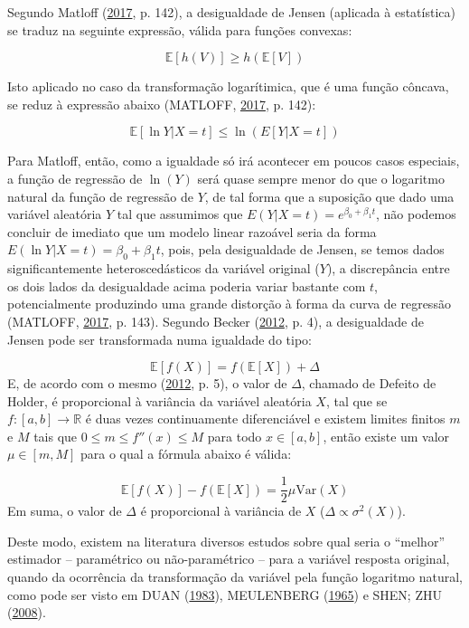 \documentclass[a4paper]{article}
\begin{document}
Segundo Matloff (\protect\hyperlink{ref-matloff2017}{2017}, p. 142), a
desigualdade de Jensen (aplicada à estatística) se traduz na seguinte
expressão, válida para funções convexas:

\[\mathbb{E}[h(V)] \geq h(\mathbb{E}[V])\]

Isto aplicado no caso da transformação logarítimica, que é uma função
côncava, se reduz à expressão abaixo (MATLOFF,
\protect\hyperlink{ref-matloff2017}{2017}, p. 142):

\[\mathbb{E}[\ln Y|X = t] \leq \ln(E[Y|X = t])\]

Para Matloff, então, como a igualdade só irá acontecer em poucos casos
especiais, a função de regressão de \(\ln(Y)\) será quase sempre menor
do que o logaritmo natural da função de regressão de \(Y\), de tal forma
que a suposição que dado uma variável aleatória \(Y\) tal que assumimos
que \(E(Y|X = t) = e^{\beta_0 + \beta_1t}\), não podemos concluir de
imediato que um modelo linear razoável seria da forma
\(E(\ln Y|X = t) = \beta_0 + \beta_1t\), pois, pela desigualdade de
Jensen, se temos dados significantemente heteroscedásticos da variável
original (\(Y\)), a discrepância entre os dois lados da desigualdade
acima poderia variar bastante com \(t\), potencialmente produzindo uma
grande distorção à forma da curva de regressão (MATLOFF,
\protect\hyperlink{ref-matloff2017}{2017}, p. 143). Segundo Becker
(\protect\hyperlink{ref-becker}{2012}, p. 4), a desigualdade de Jensen
pode ser transformada numa igualdade do tipo:

\[\mathbb{E}[f(X)] = f(\mathbb{E}[X]) + \Delta\] E, de acordo com o
mesmo (\protect\hyperlink{ref-becker}{2012}, p. 5), o valor de
\(\Delta\), chamado de Defeito de Holder, é proporcional à variância da
variável aleatória \(X\), tal que se
\(f: [a, b] \rightarrow \mathbb{R}\) é duas vezes continuamente
diferenciável e existem limites finitos \(m\) e \(M\) tais que
\(0 \leq m \leq f''(x) \leq M\) para todo \(x \in [a,b]\), então existe
um valor \(\mu \in [m, M]\) para o qual a fórmula abaixo é válida:

\[\mathbb{E}[f(X)] - f(\mathbb{E}[X]) = \frac{1}{2}\mu \mathrm{Var} (X)\]
Em suma, o valor de \(\Delta\) é proporcional à variância de \(X\)
(\(\Delta \propto \sigma^2(X)\)).

Deste modo, existem na literatura diversos estudos sobre qual seria o
``melhor'' estimador -- paramétrico ou não-paramétrico -- para a
variável resposta original, quando da ocorrência da transformação da
variável pela função logaritmo natural, como pode ser visto em DUAN
(\protect\hyperlink{ref-Duan}{1983}), MEULENBERG
(\protect\hyperlink{ref-meulenberg1965}{1965}) e SHEN; ZHU
(\protect\hyperlink{ref-shen}{2008}).
\end{document}
